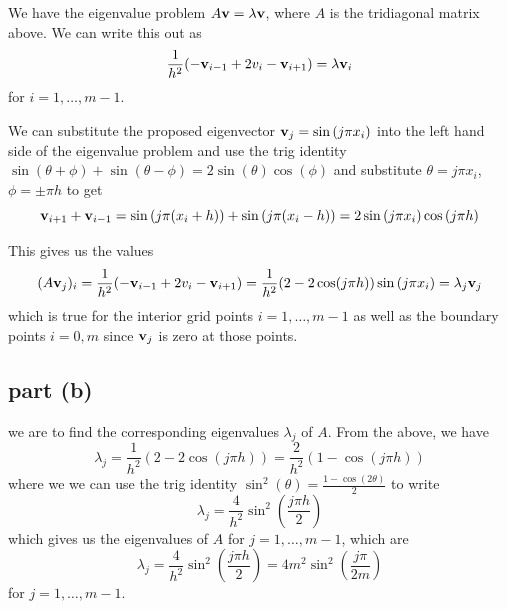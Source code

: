 \documentclass[12pt]{article}
\begin{document}
We have the eigenvalue problem $A {\bf v} = \lambda {\bf v}$, where $A$ is the tridiagonal matrix above. We can write this out as
\begin{equation}
    \dfrac{1}{h^2}(-{\bf v}_{i-1} + 2v_i - {\bf v}_{i+1}) = \lambda {\bf v}_i
\end{equation}
for $i = 1, \ldots, m-1$. 

We can substitute the proposed eigenvector ${\bf v}_j = \sin\left(j \pi x_i \right)$ into the left hand side of the eigenvalue problem  and use the trig identity $\sin(\theta + \phi) + \sin(\theta - \phi) = 2 \sin(\theta) \cos(\phi)$  and substitute $\theta = j \pi x_i$, $\phi = \pm \pi h$ to get
\begin{equation}
{\bf v}_{i+1} + {\bf v}_{i-1} = \sin\left(j \pi (x_i + h) \right) + \sin\left(j \pi (x_i - h) \right) = 2 \sin\left(j \pi x_i \right) \cos\left(j \pi h\right)
\end{equation}

This gives us the values 
\begin{equation}
   (A {\bf v}_j)_i = \dfrac{1}{h^2}(-{\bf v}_{i-1} + 2v_i - {\bf v}_{i+1}) = \dfrac{1}{h^2}(2 - 2\cos(j \pi h)) \sin\left(j \pi x_i \right) = \lambda_j {\bf v}_j
\end{equation}
which is true for the interior grid points $i = 1, \ldots, m-1$ as well as the boundary points $i = 0, m$ since ${\bf v}_j$ is zero at those points.

\subsection{part (b)}

we are to find the corresponding eigenvalues $\lambda_j$ of $A$. From the above, we have
\begin{equation}
    \lambda_j = \dfrac{1}{h^2}(2 - 2\cos(j \pi h)) = \dfrac{2}{h^2}(1 - \cos(j \pi h))
\end{equation}
where we we can use the trig identity $\sin^2(\theta) = \frac{1 - \cos(2\theta)}{2}$ to write
\begin{equation}
    \lambda_j = \dfrac{4}{h^2} \sin^2\left(\dfrac{j \pi h}{2}\right)
\end{equation}
which gives us the eigenvalues of $A$ for $j = 1, \ldots, m-1$, which are 
\begin{equation}
    \lambda_j = \dfrac{4}{h^2} \sin^2\left(\dfrac{j \pi h}{2}\right) = 4 m^2 \sin^2\left(\dfrac{j \pi}{2m}\right)
\end{equation}
for $j = 1, \ldots, m-1$.
\end{document}
